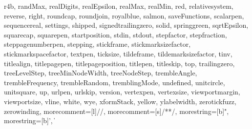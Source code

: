 {{  r4b, randMax, realDigits, realEpsilon, realMax, realMin, red,
  relativesystem, reverse, right, roundcap, roundjoin, royalblue, salmon,
  saveFunctions, scalarpen, sequencereal, settings, shipped,
  signedtrailingzero, solid, springgreen, sqrtEpsilon, squarecap, squarepen,
  startposition, stdin, stdout, stepfactor, stepfraction, steppagenumberpen,
  stepping, stickframe, stickmarksizefactor, stickmarkspacefactor, textpen,
  ticksize, tildeframe, tildemarksizefactor, tinv, titlealign, titlepagepen,
  titlepageposition, titlepen, titleskip, top, trailingzero, treeLevelStep,
  treeMinNodeWidth, treeNodeStep, trembleAngle, trembleFrequency,
  trembleRandom, tremblingMode, undefined, unitcircle, unitsquare, up,
  urlpen, urlskip, version, vertexpen, vertexsize, viewportmargin,
  viewportsize, vline, white, wye, xformStack, yellow, ylabelwidth,
  zerotickfuzz, zerowinding},
  morecomment=[l]{//},%
  morecomment=[s]{/*}{*/},%
  morestring=[b]",%
  morestring=[b]',%
}
%
%
\def\oldvert{|} %
\lstMakeShortInline[style=lesscolor]\|

\def\inlinecode{\expandafter\lstinline[style=lesscolor]}

\endinput

